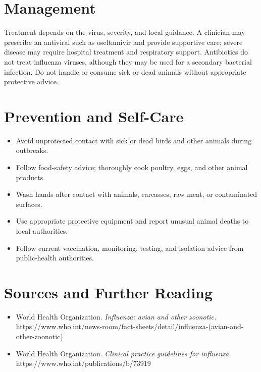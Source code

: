\section*{Management}
Treatment depends on the virus, severity, and local guidance. A clinician may prescribe an antiviral such as oseltamivir and provide supportive care; severe disease may require hospital treatment and respiratory support. Antibiotics do not treat influenza viruses, although they may be used for a secondary bacterial infection. Do not handle or consume sick or dead animals without appropriate protective advice.

\section*{Prevention and Self-Care}
\begin{itemize}
    \item Avoid unprotected contact with sick or dead birds and other animals during outbreaks.
    \item Follow food-safety advice; thoroughly cook poultry, eggs, and other animal products.
    \item Wash hands after contact with animals, carcasses, raw meat, or contaminated surfaces.
    \item Use appropriate protective equipment and report unusual animal deaths to local authorities.
    \item Follow current vaccination, monitoring, testing, and isolation advice from public-health authorities.
\end{itemize}

\section*{Sources and Further Reading}
\begin{itemize}
    \item World Health Organization. \textit{Influenza: avian and other zoonotic.} https://www.who.int/news-room/fact-sheets/detail/influenza-(avian-and-other-zoonotic)
    \item World Health Organization. \textit{Clinical practice guidelines for influenza.} https://www.who.int/publications/b/73919
\end{itemize}
